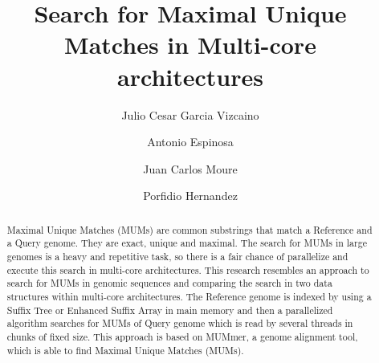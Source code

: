 \documentclass[runningheads,a4paper]{llncs}
\begin{document}
\mainmatter

\title{Search for Maximal Unique Matches in Multi-core architectures}
\author{Julio Cesar Garcia Vizcaino \and Antonio Espinosa \and Juan Carlos Moure \and Porfidio Hernandez }
 

\maketitle
\begin{center}
  \mailsa
  \mailsb
\end{center}

\begin{abstract}
  Maximal Unique Matches (MUMs) are common substrings that match a Reference and a Query genome. They are exact, unique and maximal. The search for MUMs in large genomes is a heavy and repetitive task, so there is a fair chance of parallelize and execute this search in multi-core architectures. This research resembles an approach to search for MUMs in genomic sequences and comparing the search in two data structures within multi-core architectures. The Reference genome is indexed by using a Suffix Tree or Enhanced Suffix Array in main memory and then a parallelized algorithm searches for MUMs of Query genome which is read by several threads in chunks of fixed size. This approach is based on MUMmer, a genome alignment tool, which is able to find Maximal Unique Matches (MUMs). 

\end{abstract}
\end{document}
